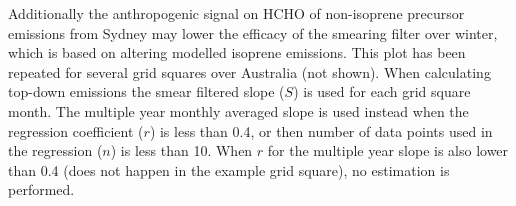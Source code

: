    Additionally the anthropogenic signal on HCHO of non-isoprene precursor emissions from Sydney may lower the efficacy of the smearing filter over winter, which is based on altering modelled isoprene emissions.
    This plot has been repeated for several grid squares over Australia (not shown).
    When calculating top-down emissions the smear filtered slope ($S$) is used for each grid square month.
    The multiple year monthly averaged slope is used instead when the regression coefficient ($r$) is less than 0.4, or then number of data points used in the regression ($n$) is less than 10.
    When $r$ for the multiple year slope is also lower than 0.4 (does not happen in the example grid square), no estimation is performed.%
    
    
    
